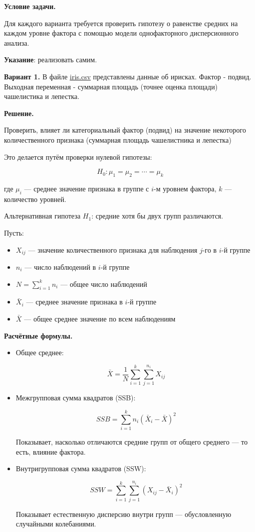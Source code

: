 \documentclass[12pt]{article}
\begin{document}
	\textbf{Условие задачи.}
	
	Для каждого варианта требуется проверить гипотезу о равенстве средних на каждом уровне фактора с помощью модели однофакторного дисперсионного анализа.
	
	\textbf{Указание}: реализовать самим.
	
	\textbf{Вариант 1.}
	В файле \href{https://drive.google.com/file/d/1CSCheMzjberRwgcf90BBu-J6uxMg-Qf7/view}{
	iris.csv} представлены данные об ирисках. Фактор - подвид. Выходная переменная - суммарная площадь (точнее оценка площади) чашелистика и лепестка.
	\vspace*{1em}
	
	\textbf{Решение.}
	
	Проверить, влияет ли категориальный фактор (подвид) на значение некоторого количественного признака (суммарная площадь чашелистника и лепестка)
	
	Это делается путём проверки нулевой гипотезы:
	
	$$ H_0: \mu_1 = \mu_2 = \cdots = \mu_k $$
	
	где $\mu_i$ — среднее значение признака в группе с $i$-м уровнем фактора, $k$ — количество уровней.
	
	Альтернативная гипотеза $H_1$: средние хотя бы двух групп различаются.
	
	Пусть:
	\begin{itemize}
		\item $X_{ij}$ — значение количественного признака для наблюдения $j$-го в $i$-й группе
		\item $n_i$ — число наблюдений в $i$-й группе
		\item $N = \sum_{i=1}^k n_i$ — общее число наблюдений
		\item $\bar{X}_i$ — среднее значение признака в $i$-й группе
		\item $\bar{X}$ — общее среднее значение по всем наблюдениям
	\end{itemize}
	
	\textbf{Расчётные формулы.}
	
	\begin{itemize}
		\item Общее среднее:
		
		$$ \bar{X} = \frac{1}{N} \sum_{i=1}^k \sum_{j=1}^{n_i} X_{ij} $$
		
		\item Межгрупповая сумма квадратов (SSB):
		
		$$ SSB = \sum_{i=1}^k n_i (\bar{X}_i - \bar{X})^2 $$
		
		Показывает, насколько отличаются средние групп от общего среднего — то есть, влияние фактора.
		
		\item Внутригрупповая сумма квадратов (SSW):
		
		$$ SSW = \sum_{i=1}^k \sum_{j=1}^{n_i} (X_{ij} - \bar{X}_i)^2 $$
		
		Показывает естественную дисперсию внутри групп — обусловленную случайными колебаниями.
	\end{itemize}
	
\end{document}
